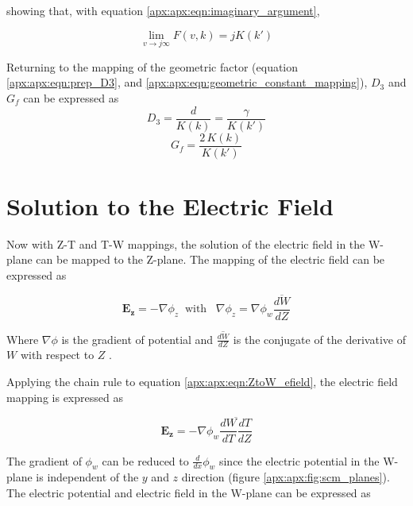  \noindent showing that, with equation \ref{apx:apx:eqn:imaginary_argument},
 
 \begin{equation}
     \lim_{v\to j\infty} F(v,k) = jK(k')
 \end{equation}
 
 \noindent Returning to the mapping of the geometric factor (equation \ref{apx:apx:eqn:prep_D3}, and \ref{apx:apx:eqn:geometric_constant_mapping}), $D_3$ and $G_f$ can be expressed as
 \begin{equation}
     D_3 = \frac{d}{K(k)} = \frac{\gamma}{K(k')}
     \label{apx:apx:eqn:D3}
 \end{equation}
 \begin{equation}
     G_f = \frac{2\,K(k)}{K(k')}
     \label{apx:apx:eqn:Gf}
 \end{equation}
 
 \section{Solution to the Electric Field}
 \label{apx:apx:app:analytic_electric_field}
 
 \par Now with Z-T and T-W mappings, the solution of the electric field in the W-plane can be mapped to the Z-plane. The mapping of the electric field can be expressed as 
 
 \begin{equation}
     \boldsymbol{E_z} = -\nabla \phi_z \;\;\text{with} \;\;\;\nabla \phi_z = \nabla \phi_w \overline{\frac{dW}{dZ}}
     \label{apx:apx:eqn:ZtoW_efield}
 \end{equation}
 
 \noindent Where $\nabla \phi$ is the gradient of potential and $\overline{\frac{dW}{dZ}}$ is the conjugate of the derivative of $W$ with respect to $Z$ \cite{schinzinger_conformal_2012}.
 
 \par Applying the chain rule to equation \ref{apx:apx:eqn:ZtoW_efield}, the electric field mapping is expressed as
 
 \begin{equation}
    \boldsymbol{E_z} =- \nabla \phi_w \overline{\frac{dW}{dT}\frac{dT}{dZ}}
    \label{apx:apx:eqn:ZtoW_efield_chain}
 \end{equation}
 
 The gradient of $ \phi_w$ can be reduced to $\frac{d}{dx} \phi_w$ since the electric potential in the W-plane is independent of the $y$ and $z$ direction (figure \ref{apx:apx:fig:scm_planes}). The electric potential and electric field in the W-plane can be expressed as 
 
